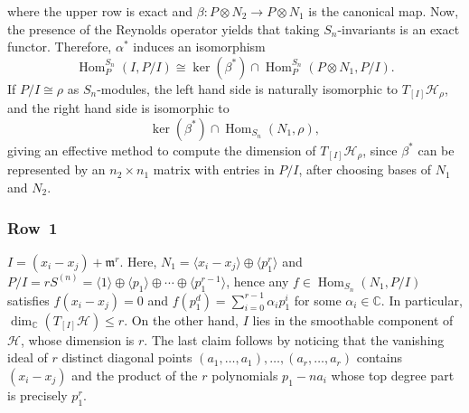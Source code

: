 \documentclass[11pt]{amsart}
\theoremstyle{definition}
\newcommand{\CC}{\mathbb{C}}
\newcommand{\mm}{\mathfrak{m}}
\newcommand{\HH}{\mathcal{H}}
\DeclareMathOperator{\Hom}{Hom}
\begin{document}
where the upper row is exact and $\beta: P \otimes N_2 \rightarrow P \otimes N_1$ is the canonical map. Now, the presence of the Reynolds operator yields that taking $S_n$-invariants is an exact functor. Therefore, $\alpha^\ast$ induces an isomorphism 
\begin{equation*}
    \Hom^{S_n}_P(I,P/I) \cong \ker(\beta^\ast) \cap \Hom^{S_n}_P(P \otimes N_1, P/I).
\end{equation*}
If $P/I \cong \rho$ as $S_n$-modules, the left hand side is naturally isomorphic to $T_{[I]} \HH_\rho$, and the right hand side is isomorphic to
\begin{equation*}
    \ker(\beta^\ast) \cap \Hom_{S_n}(N_1,\rho),
\end{equation*}
giving an effective method to compute the dimension of $T_{[I]} \HH_\rho$, since $\beta^\ast$ can be represented by an $n_2 \times n_1$ matrix with entries in $P/I$, after choosing bases of $N_1$ and $N_2$.

\subsubsection{Row~1} $I = (x_i - x_j) + \mm^r$. Here, $N_1 = \langle x_i - x_j \rangle \oplus \langle p_1^r \rangle$ and $P/I = r S^{(n)} = \langle 1 \rangle \oplus \langle p_1 \rangle \oplus \cdots \oplus \langle p_1^{r-1} \rangle$, hence any $f \in \Hom_{S_n}(N_1,P/I)$ satisfies $f(x_i - x_j) = 0$ and $f(p_1^d) = \sum_{i=0}^{r-1} \alpha_i p_1^i$ for some $\alpha_i \in \CC$. In particular, $\dim_\CC(T_{[I]} \HH) \leq r$. On the other hand, $I$ lies in the smoothable component of $\HH$, whose dimension is $r$. The last claim follows by noticing that the vanishing ideal of $r$ distinct diagonal points $(a_1, \ldots, a_1), \ldots, (a_r, \ldots, a_r)$ contains $(x_i - x_j)$ and the product of the $r$ polynomials $p_1 - n a_i$ whose top degree part is precisely $p_1^r$. 
\end{document}
